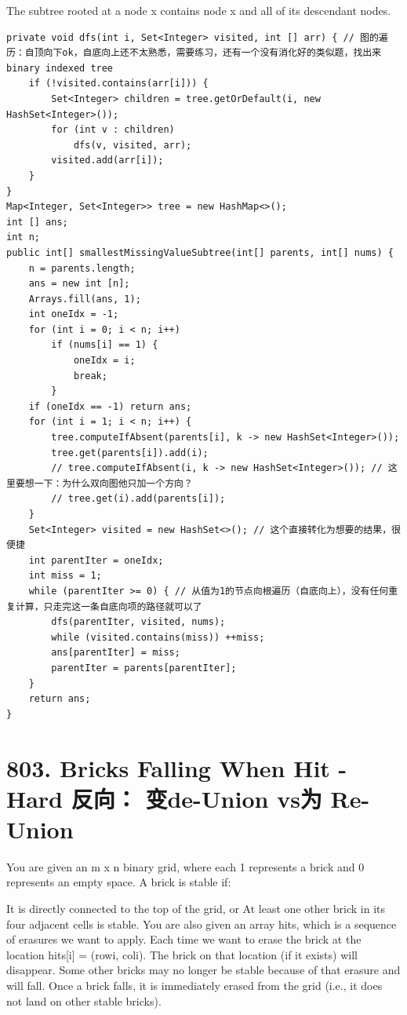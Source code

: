 \documentclass[9pt, b5paaper]{book}
\begin{document}
The subtree rooted at a node x contains node x and all of its descendant nodes.
\begin{verbatim}
private void dfs(int i, Set<Integer> visited, int [] arr) { // 图的遍历：自顶向下ok，自底向上还不太熟悉，需要练习，还有一个没有消化好的类似题，找出来binary indexed tree
    if (!visited.contains(arr[i])) {
        Set<Integer> children = tree.getOrDefault(i, new HashSet<Integer>());
        for (int v : children) 
            dfs(v, visited, arr);
        visited.add(arr[i]);
    }
}
Map<Integer, Set<Integer>> tree = new HashMap<>();
int [] ans;
int n;
public int[] smallestMissingValueSubtree(int[] parents, int[] nums) {
    n = parents.length;
    ans = new int [n];
    Arrays.fill(ans, 1); 
    int oneIdx = -1;
    for (int i = 0; i < n; i++) 
        if (nums[i] == 1) {
            oneIdx = i;
            break;
        }
    if (oneIdx == -1) return ans;
    for (int i = 1; i < n; i++) {
        tree.computeIfAbsent(parents[i], k -> new HashSet<Integer>());
        tree.get(parents[i]).add(i);
        // tree.computeIfAbsent(i, k -> new HashSet<Integer>()); // 这里要想一下：为什么双向图他只加一个方向？
        // tree.get(i).add(parents[i]);
    }
    Set<Integer> visited = new HashSet<>(); // 这个直接转化为想要的结果，很便捷
    int parentIter = oneIdx;
    int miss = 1;
    while (parentIter >= 0) { // 从值为1的节点向根遍历（自底向上），没有任何重复计算，只走完这一条自底向项的路径就可以了
        dfs(parentIter, visited, nums);
        while (visited.contains(miss)) ++miss;
        ans[parentIter] = miss;
        parentIter = parents[parentIter];
    }
    return ans;
}
\end{verbatim}

\section{803. Bricks Falling When Hit - Hard 反向： 变de-Union vs为 Re-Union}
\label{sec-6-3}
You are given an m x n binary grid, where each 1 represents a brick and 0 represents an empty space. A brick is stable if:

It is directly connected to the top of the grid, or
At least one other brick in its four adjacent cells is stable.
You are also given an array hits, which is a sequence of erasures we want to apply. Each time we want to erase the brick at the location hits[i] = (rowi, coli). The brick on that location (if it exists) will disappear. Some other bricks may no longer be stable because of that erasure and will fall. Once a brick falls, it is immediately erased from the grid (i.e., it does not land on other stable bricks).
\end{document}
